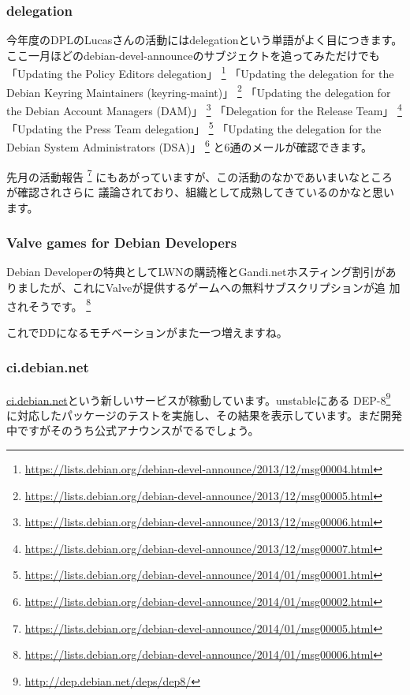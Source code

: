 \documentclass[mingoth,a4paper]{jsarticle}
\begin{document}
\subsubsection{delegation}
今年度のDPLのLucasさんの活動にはdelegationという単語がよく目につきます。
ここ一月ほどのdebian-devel-announceのサブジェクトを追ってみただけでも
「Updating the Policy Editors delegation」
\footnote{\url{https://lists.debian.org/debian-devel-announce/2013/12/msg00004.html}}
「Updating the delegation for the Debian Keyring Maintainers (keyring-maint)」
\footnote{\url{https://lists.debian.org/debian-devel-announce/2013/12/msg00005.html}}
「Updating the delegation for the Debian Account Managers (DAM)」
\footnote{\url{https://lists.debian.org/debian-devel-announce/2013/12/msg00006.html}}
「Delegation for the Release Team」
\footnote{\url{https://lists.debian.org/debian-devel-announce/2013/12/msg00007.html}}
「Updating the Press Team delegation」
\footnote{\url{https://lists.debian.org/debian-devel-announce/2014/01/msg00001.html}}
「Updating the delegation for the Debian System Administrators (DSA)」
\footnote{\url{https://lists.debian.org/debian-devel-announce/2014/01/msg00002.html}}
と6通のメールが確認できます。

先月の活動報告
\footnote{\url{https://lists.debian.org/debian-devel-announce/2014/01/msg00005.html}}
にもあがっていますが、この活動のなかであいまいなところが確認されさらに
議論されており、組織として成熟してきているのかなと思います。

\subsubsection{Valve games for Debian Developers}
Debian Developerの特典としてLWNの購読権とGandi.netホスティング割引があ
りましたが、これにValveが提供するゲームへの無料サブスクリプションが追
加されそうです。
\footnote{\url{https://lists.debian.org/debian-devel-announce/2014/01/msg00006.html}}

これでDDになるモチベーションがまた一つ増えますね。

\subsubsection{ci.debian.net}
\url{ci.debian.net}という新しいサービスが稼動しています。unstableにある
DEP-8\footnote{\url{http://dep.debian.net/deps/dep8/}}
に対応したパッケージのテストを実施し、その結果を表示しています。まだ開発
中ですがそのうち公式アナウンスがでるでしょう。

\end{document}
